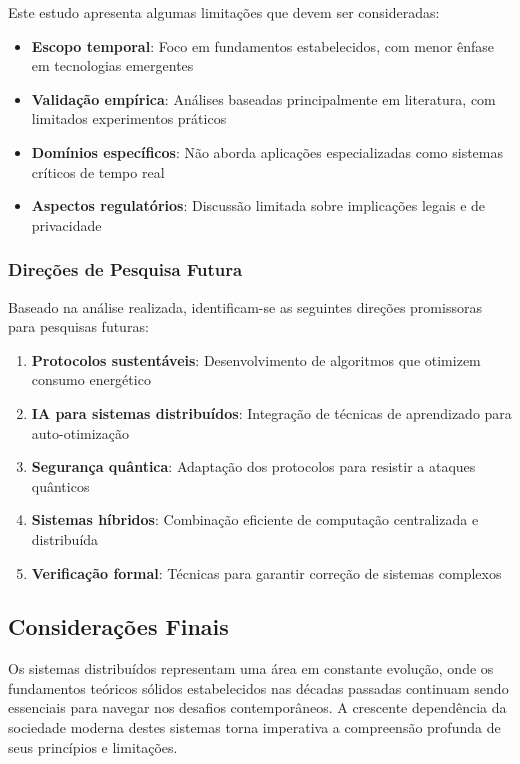 Este estudo apresenta algumas limitações que devem ser consideradas:

\begin{itemize}
    \item \textbf{Escopo temporal}: Foco em fundamentos estabelecidos, com menor ênfase em tecnologias emergentes
    \item \textbf{Validação empírica}: Análises baseadas principalmente em literatura, com limitados experimentos práticos
    \item \textbf{Domínios específicos}: Não aborda aplicações especializadas como sistemas críticos de tempo real
    \item \textbf{Aspectos regulatórios}: Discussão limitada sobre implicações legais e de privacidade
\end{itemize}

\subsubsection{Direções de Pesquisa Futura}

Baseado na análise realizada, identificam-se as seguintes direções promissoras para pesquisas futuras:

\begin{enumerate}
    \item \textbf{Protocolos sustentáveis}: Desenvolvimento de algoritmos que otimizem consumo energético
    \item \textbf{IA para sistemas distribuídos}: Integração de técnicas de aprendizado para auto-otimização
    \item \textbf{Segurança quântica}: Adaptação dos protocolos para resistir a ataques quânticos
    \item \textbf{Sistemas híbridos}: Combinação eficiente de computação centralizada e distribuída
    \item \textbf{Verificação formal}: Técnicas para garantir correção de sistemas complexos
\end{enumerate}

\subsection{Considerações Finais}

Os sistemas distribuídos representam uma área em constante evolução, onde os fundamentos teóricos sólidos estabelecidos nas décadas passadas continuam sendo essenciais para navegar nos desafios contemporâneos. A crescente dependência da sociedade moderna destes sistemas torna imperativa a compreensão profunda de seus princípios e limitações.

